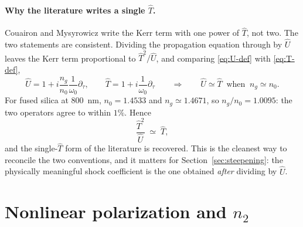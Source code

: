 \documentclass[11pt,a4paper]{article}
\begin{document}
\paragraph{Why the literature writes a single $\hat T$.} Couairon and
Mysyrowicz write the Kerr term with one power of $\hat T$, not two. The two
statements are consistent. Dividing the propagation equation through by $\hat U$
leaves the Kerr term proportional to $\hat T^2/\hat U$, and comparing
\eqref{eq:U-def} with \eqref{eq:T-def},
\begin{equation}
\hat U = 1+i\frac{n_g}{n_0}\frac{1}{\omega_0}\partial_\tau,
\qquad
\hat T = 1+i\frac{1}{\omega_0}\partial_\tau
\qquad\Longrightarrow\qquad
\hat U \simeq \hat T \;\;\text{when}\;\; n_g\simeq n_0 .
\end{equation}
For fused silica at $800$~nm, $n_0=1.4533$ and $n_g\simeq 1.4671$, so
$n_g/n_0=1.0095$: the two operators agree to within $1\%$. Hence
\begin{equation}
\label{eq:T2overU}
\frac{\hat T^2}{\hat U}\;\simeq\;\hat T ,
\end{equation}
and the single-$\hat T$ form of the literature is recovered. This is the
cleanest way to reconcile the two conventions, and it matters for
Section~\ref{sec:steepening}: the physically meaningful shock coefficient is the
one obtained \emph{after} dividing by $\hat U$.

\section{Nonlinear polarization and \texorpdfstring{$n_2$}{n2}}
\end{document}
